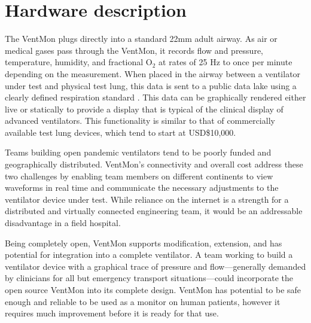 \documentclass[11pt, letterpaper]{article}
\begin{document}
\section{Hardware description}


The VentMon plugs directly into a standard 22mm adult airway. As air or medical gases pass through the VentMon, it records flow and pressure, temperature, humidity, and fractional O$_2$ at rates of 25 Hz to once per minute depending on the measurement. When placed in the airway between a ventilator under test and physical test lung, this data is sent to a public data lake \cite{VentDisplay} using a clearly defined respiration standard \cite{PIRDS}. This data can be graphically rendered either live or statically to provide a display that is typical of the clinical display of advanced ventilators. This functionality is similar to that of commercially available test lung devices, which tend to start at USD\$10,000.

Teams building open pandemic ventilators tend to be poorly funded and geographically distributed. VentMon's connectivity and overall cost address these two challenges by enabling team members on different continents to view waveforms in real time and communicate the necessary adjustments to the ventilator device under test. While reliance on the internet is a strength for a distributed and virtually connected engineering team, it would be an addressable disadvantage in a field hospital.

Being completely open, VentMon supports modification, extension, and has potential for integration into a complete ventilator. A team working to build a ventilator device with a graphical trace of pressure and flow---generally demanded by clinicians for all but emergency transport situations---could incorporate the open source VentMon into its complete design. VentMon has potential to be safe enough and reliable to be used as a monitor on human patients, however it requires much improvement before it is ready for that use.
\\
\end{document}
